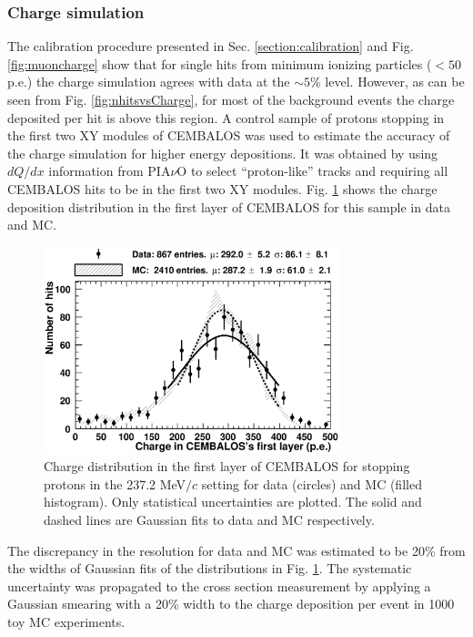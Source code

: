 \subsubsection{\bf Charge simulation}
The calibration procedure presented in Sec. \ref{section:calibration} and Fig. \ref{fig:muoncharge} show that for single hits from minimum ionizing particles ($<50$ p.e.) the charge simulation agrees with data at the $\sim5$\% level. However, as can be seen from Fig. \ref{fig:nhitsvsCharge}, for most of the background events the charge deposited per hit is above this region. A control sample of protons stopping in the first two XY modules of CEMBALOS was used to estimate the accuracy of the charge simulation for higher energy depositions. It was obtained by using $dQ/dx$ information from PIA$\nu$O to select ``proton-like'' tracks and requiring all CEMBALOS hits to be in the first two XY modules. Fig. \ref{fig:proton_sample} shows the charge deposition distribution in the first layer of CEMBALOS for this sample in data and MC.
\begin{figure}[ht]
 \includegraphics[width=86mm]{figures/proton_contained_1stlayer.eps}
 \caption{Charge distribution in the first layer of CEMBALOS for stopping protons in the 237.2 MeV$/c$ setting for data (circles) and MC (filled histogram). Only statistical uncertainties are plotted. The solid and dashed lines are Gaussian fits to data and MC respectively.}
 \label{fig:proton_sample}
\end{figure}

{\color{red}The discrepancy in the resolution for data and MC was estimated to be 20\% from the widths of Gaussian fits of the distributions in Fig. \ref{fig:proton_sample}}. The systematic uncertainty was propagated to the cross section measurement by applying a Gaussian smearing with a 20\% width to the charge deposition per event in 1000 toy MC experiments.

